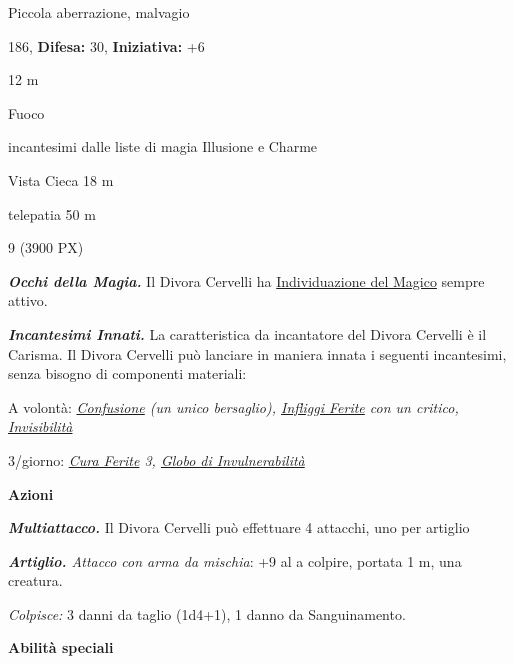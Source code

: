 \begin{multicols}{2}
{
\noindent
\begin{description}[noitemsep, topsep=0pt, parsep=0pt, partopsep=0pt, leftmargin=0cm, labelwidth=2.2cm]
	\item[\textbf{Taglia/Tipo:}] Piccola aberrazione, malvagio
	\item[\textbf{Caratt.:}] 
	\item[\textbf{Punti Ferita:}] 186,  \textbf{Difesa:} 30,  \textbf{Iniziativa:} +6
	\item[\textbf{Movimento:}] 12 m
	\item[\textbf{Tiri Salvez.:}] 
	\item[\textbf{Imm. Danni:}] Fuoco
	\item[\textbf{Immunità:}] incantesimi dalle liste di magia Illusione e Charme
	\item[\textbf{Sensi:}] Vista Cieca 18 m
	\item[\textbf{Linguaggi:}] telepatia 50 m
	\item[\textbf{Sfida:}] 9 (3900 PX)\smallskip
\end{description}

\emph{\textbf{Occhi della Magia.}} Il Divora Cervelli ha \hyperlink{Individuazione del Magico}{Individuazione del Magico} sempre attivo.

\emph{\textbf{Incantesimi Innati.}} La caratteristica da incantatore del Divora Cervelli è il Carisma. Il Divora Cervelli può lanciare in maniera innata i seguenti incantesimi, senza bisogno di componenti materiali:

A volontà: \emph{\hyperlink{Confusione}{Confusione} (un unico bersaglio), \hyperlink{Infliggi Ferite}{Infliggi Ferite} con un critico, \hyperlink{Invisibilità}{Invisibilità}}

3/giorno: \emph{\hyperlink{Cura Ferite}{Cura Ferite} 3, \hyperlink{Globo di Invulnerabilità}{Globo di Invulnerabilità}}

\textbf{Azioni}

\emph{\textbf{Multiattacco.}} Il Divora Cervelli può effettuare 4 attacchi, uno per artiglio

\emph{\textbf{Artiglio.} Attacco con arma da mischia}: +9 al a colpire, portata 1 m, una creatura.

\emph{Colpisce:} 3 danni da taglio (1d4+1), 1 danno da Sanguinamento.

\textbf{Abilità speciali}

}
\end{multicols}
